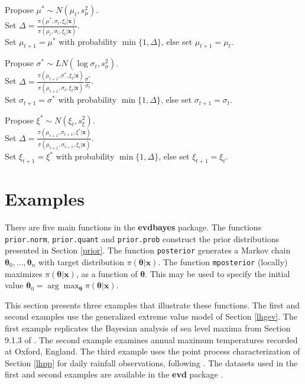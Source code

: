 \documentclass[11pt,a4paper]{article}
\newcommand{\bs}{\boldsymbol}
\begin{document}
\begin{flushleft}
  Propose $\mu^* \sim N(\mu_t, s_\mu^2)$.\\
  Set $\Delta =
  \frac{\pi(\mu^*,\sigma_t,\xi_t|\bs{x})}{\pi(\mu_t,\sigma_t,\xi_t|\bs{x})}$.\\ 
  Set $\mu_{t+1} = \mu^*$ with probability $\min\{1, \Delta\}$, else
  set $\mu_{t+1} = \mu_t$.

  Propose $\sigma^* \sim LN(\log \sigma_t, s_\sigma^2)$.\\
  Set $\Delta =
  \frac{\pi(\mu_{t+1},\sigma^*,\xi_t|\bs{x})}{\pi(\mu_{t+1},\sigma_t,\xi_t|\bs{x})} \frac{\sigma^*}{\sigma_t}$.\\ 
  Set $\sigma_{t+1} = \sigma^*$ with probability $\min\{1, \Delta\}$,
  else set $\sigma_{t+1} = \sigma_t$.

  Propose $\xi^* \sim N(\xi_t, s_\xi^2)$.\\
  Set $\Delta =
  \frac{\pi(\mu_{t+1},\sigma_{t+1},\xi^*|\bs{x})}{\pi(\mu_{t+1},\sigma_{t+1},\xi_t|\bs{x})}$.\\ 
  Set $\xi_{t+1} = \xi^*$ with probability $\min\{1, \Delta\}$, else
  set $\xi_{t+1} = \xi_t$.
\end{flushleft}


\section{Examples}
\setcounter{footnote}{0}
\label{eg} 

There are five main functions in the \textbf{evdbayes} package.  The
functions \verb+prior.norm+, \verb+prior.quant+ and \verb+prior.prob+
construct the prior distributions presented in Section \ref{prior}.
The function \verb+posterior+ generates a Markov chain
$\bs{\theta}_0,\dots,\bs{\theta}_n$ with target distribution
$\pi(\bs{\theta}|\bs{x})$.  The function \verb+mposterior+ (locally)
maximizes $\pi(\bs{\theta}|\bs{x})$, as a function of $\bs{\theta}$.
This may be used to specify the initial value $\bs{\theta}_0 =
\arg\max_{\bs{\theta}} \pi(\bs{\theta}|\bs{x})$.

This section presents three examples that illustrate these functions.
The first and second examples use the generalized extreme value model
of Section \ref{lhgev}.  The first example replicates the Bayesian
analysis of sea level maxima from Section 9.1.3 of \citet{cole01}.
The second example examines annual maximum temperatures recorded at
Oxford, England.  The third example uses the point process
characterization of Section \ref{lhpp} for daily rainfall
observations, following \citet{coletawn94}.  The datasets used in the
first and second examples are available in the \textbf{evd} package
\citep{step:rn}.
\end{document}
